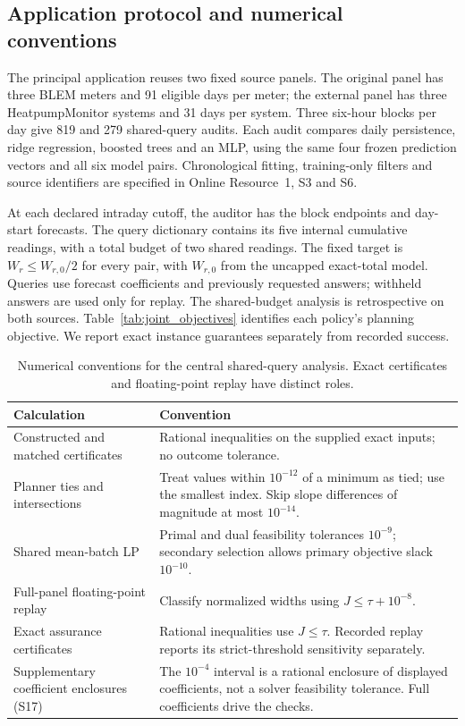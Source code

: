\subsection{Application protocol and numerical conventions}
\label{sec:joint-protocol-summary}
The principal application reuses two fixed source panels. The original
panel has three BLEM meters and 91 eligible days per meter; the external
panel has three HeatpumpMonitor systems and 31 days per system. Three
six-hour blocks per day give 819 and 279 shared-query audits. Each audit
compares daily persistence, ridge regression, boosted trees and an MLP,
using the same four frozen prediction vectors and all six model pairs.
Chronological fitting, training-only filters and source identifiers are
specified in Online Resource~1, S3 and S6.

At each declared intraday cutoff, the auditor has the block endpoints and
day-start forecasts. The query dictionary contains its five internal
cumulative readings, with a total budget of two shared readings.
The fixed target is $W_r\leq W_{r,0}/2$ for every pair, with $W_{r,0}$ from
the uncapped exact-total model. Queries use forecast coefficients and
previously requested answers; withheld answers are used only for replay.
The shared-budget analysis is retrospective on both sources.
Table~\ref{tab:joint_objectives} identifies each policy's planning objective.
We report exact instance guarantees separately from recorded success.

\begin{table}[htbp]\centering\small
\caption{Numerical conventions for the central shared-query analysis.
Exact certificates and floating-point replay have distinct roles.}
\label{tab:numerical-conventions}
\begin{tabular}{@{}>{\raggedright\arraybackslash}p{.27\linewidth}>{\raggedright\arraybackslash}p{.66\linewidth}@{}}
\toprule
Calculation & Convention\\\midrule
Constructed and matched certificates &
Rational inequalities on the supplied exact inputs; no outcome tolerance.\\
Planner ties and intersections &
Treat values within $10^{-12}$ of a minimum as tied; use the smallest index.
Skip slope differences of magnitude at most $10^{-14}$.\\
Shared mean-batch LP &
Primal and dual feasibility tolerances $10^{-9}$; secondary selection
allows primary objective slack $10^{-10}$.\\
Full-panel floating-point replay &
Classify normalized widths using $J\leq\tau+10^{-8}$.\\
Exact assurance certificates &
Rational inequalities use $J\leq\tau$. Recorded replay reports its
strict-threshold sensitivity separately.\\
Supplementary coefficient enclosures (S17) &
The $10^{-4}$ interval is a rational enclosure of displayed coefficients,
not a solver feasibility tolerance. Full coefficients drive the checks.\\
\bottomrule\end{tabular}\end{table}
